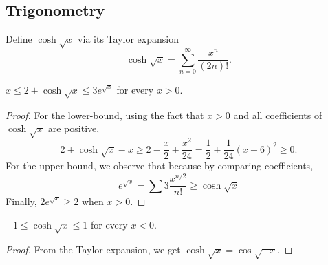 
\begin{definition}[Books]
  \label{def:book}
\end{definition}


\subsection{Trigonometry}

\begin{definition}
  \label{def:coshsqrt} %
  \leanok
  Define $\cosh \sqrt{x}$ via its Taylor expansion
  $$\cosh\sqrt{x} = \sum_{n = 0}^\infty \frac{x^n}{(2n)!}.$$
\end{definition}

\begin{lemma}
  \label{lem:coshsqrt-bd-pos}
  \leanok
  $x \le 2 + \cosh \sqrt{x} \le 3 e^{\sqrt{x}}$ for every $x > 0$.
\end{lemma}
%
\begin{proof}
  For the lower-bound, using the fact that $x>0$ and all coefficients of $\cosh \sqrt{x}$ are positive,
  \begin{equation*}
    2+\cosh \sqrt{x} - x \ge 2 - \frac{x}{2} + \frac{x^2}{24} = \frac{1}{2}+\frac{1}{24}(x-6)^2 \ge 0.
  \end{equation*}
  For the upper bound, we observe that because by comparing coefficients,
  \begin{equation*}
    e^{\sqrt{x}} = \sum 3\frac{x^{n/2}}{n!}  \ge \cosh\sqrt{x}
  \end{equation*}
  Finally, $2e^{\sqrt{x}}\ge 2$ when $x>0$.
\end{proof}

\begin{lemma}
  \label{lem:coshsqrt-bd-neg}
  \leanok
  $-1 \le \cosh \sqrt{x} \le 1$ for every $x < 0$.
\end{lemma}
%
\begin{proof}
  From the Taylor expansion, we get $\cosh \sqrt{x} = \cos \sqrt{-x}$.
\end{proof}

